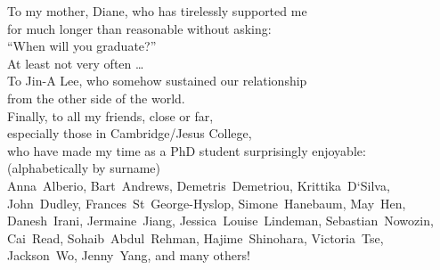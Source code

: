 
\begin{dedication}
To my mother, Diane, who has tirelessly supported me\\
for much longer than reasonable without asking:\\
``When will you graduate?''\\
At least not very often \ldots{}\\
\vspace{0.33\textheight minus 10ex}
To Jin-A Lee, who somehow sustained our relationship\\
from the other side of the world.\\
\vspace{0.11\textheight minus 10ex}
Finally, to all my friends, close or far,\\
especially those in Cambridge/Jesus College,\\
who have made my time as a PhD student surprisingly enjoyable:\\
\vspace{1em}
{\small(alphabetically by surname)}\\
\vspace{0.5em}
Anna~Alberio,
Bart~Andrews,
Demetris~Demetriou,
Krittika~D`Silva,
John~Dudley,
Frances~St~George-Hyslop,
Simone~Hanebaum,
May~Hen,
Danesh~Irani,
Jermaine~Jiang,
Jessica~Louise~Lindeman,
Sebastian~Nowozin,
Cai~Read,
Sohaib~Abdul~Rehman,
Hajime~Shinohara,
Victoria~Tse,
Jackson~Wo,
Jenny~Yang,
and many others!
\end{dedication}